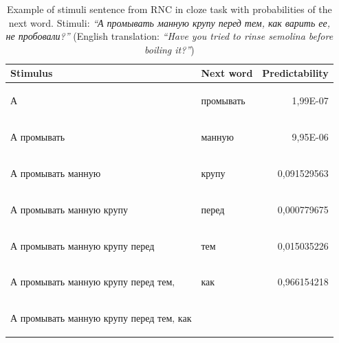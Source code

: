 \documentclass[a4paper]{article}
\begin{document}
\begin{table}
\label{tbl:stimuli}
\caption{Example of stimuli sentence from RNC in cloze task with
probabilities of the next word. Stimuli: \textit{``А промывать манную
крупу перед тем, как варить ее, не пробовали?''} (English translation:
\textit{``Have you tried to rinse semolina before boiling it?''})
\newline}
\centering
\begin{tabular}{llr}

\textbf{Stimulus} & \textbf{Next word} & \textbf{Predictability} \\
\hline
\begin{russian} А \end{russian} &
\begin{russian} промывать \end{russian} &
1,99E-07 \\
\begin{russian} А промывать \end{russian} &
\begin{russian} манную \end{russian} &
9,95E-06 \\
\begin{russian} А промывать манную \end{russian} &
\begin{russian} крупу \end{russian} &
0,091529563 \\
\begin{russian} А промывать манную крупу \end{russian} &
\begin{russian} перед \end{russian} &
0,000779675 \\
\begin{russian} А промывать манную крупу перед \end{russian} &
\begin{russian} тем \end{russian} &
0,015035226 \\
\begin{russian} А промывать манную крупу перед тем‚ \end{russian} &
\begin{russian} как \end{russian} &
0,966154218 \\
\begin{russian} А промывать манную крупу перед тем‚ как \end{russian} &

\end{tabular}
\end{table}
\end{document}
